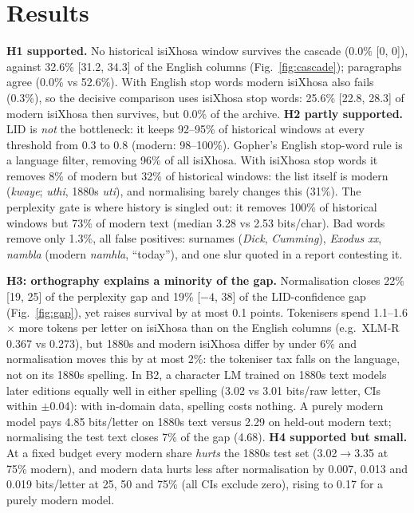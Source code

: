 \documentclass[10pt,letterpaper]{article}
\begin{document}
\section{Results}
\textbf{H1 supported.} No historical isiXhosa window survives the cascade (0.0\% [0, 0]), against 32.6\% [31.2, 34.3] of the English columns (Fig.~\ref{fig:cascade}); paragraphs agree (0.0\% vs 52.6\%). With English stop words modern isiXhosa also fails (0.3\%), so the decisive comparison uses isiXhosa stop words: 25.6\% [22.8, 28.3] of modern isiXhosa then survives, but 0.0\% of the archive. \textbf{H2 partly supported.} LID is \emph{not} the bottleneck: it keeps 92--95\% of historical windows at every threshold from 0.3 to 0.8 (modern: 98--100\%). Gopher's English stop-word rule is a language filter, removing 96\% of all isiXhosa. With isiXhosa stop words it removes 8\% of modern but 32\% of historical windows: the list itself is modern (\emph{kwaye}; \emph{uthi}, 1880s \emph{uti}), and normalising barely changes this (31\%). The perplexity gate is where history is singled out: it removes 100\% of historical windows but 73\% of modern text (median 3.28 vs 2.53 bits/char). Bad words remove only 1.3\%, all false positives: surnames (\emph{Dick}, \emph{Cumming}), \emph{Exodus xx}, \emph{nambla} (modern \emph{namhla}, ``today''), and one slur quoted in a report contesting it.

\textbf{H3: orthography explains a minority of the gap.} Normalisation closes 22\% [19, 25] of the perplexity gap and 19\% [$-4$, 38] of the LID-confidence gap (Fig.~\ref{fig:gap}), yet raises survival by at most 0.1 points. Tokenisers spend 1.1--1.6$\times$ more tokens per letter on isiXhosa than on the English columns (e.g.\ XLM-R 0.367 vs 0.273), but 1880s and modern isiXhosa differ by under 6\% and normalisation moves this by at most 2\%: the tokeniser tax falls on the language, not on its 1880s spelling. In B2, a character LM trained on 1880s text models later editions equally well in either spelling (3.02 vs 3.01 bits/raw letter, CIs within $\pm$0.04): with in-domain data, spelling costs nothing. A purely modern model pays 4.85 bits/letter on 1880s text versus 2.29 on held-out modern text; normalising the test text closes 7\% of the gap (4.68). \textbf{H4 supported but small.} At a fixed budget every modern share \emph{hurts} the 1880s test set (3.02$\to$3.35 at 75\% modern), and modern data hurts less after normalisation by 0.007, 0.013 and 0.019 bits/letter at 25, 50 and 75\% (all CIs exclude zero), rising to 0.17 for a purely modern model.
\end{document}
